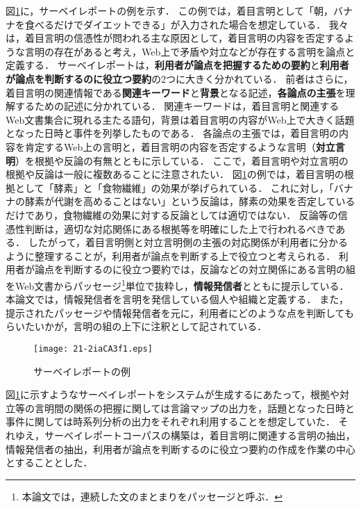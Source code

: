 \documentclass[japanese]{jnlp_1.4}
\begin{document}
図\ref{fg:survey_report}に，{サーベイ}レポートの例を示す．
この例では，着目言明として「朝，バナナを食べるだけでダイエットできる」が入力された場合を想定している．
{我々は}，着目言明の信憑性が問われる主な原因として，着目言明の内容を否定するような言明の存在があると考え，Web上で矛盾や対立などが存在する言明を論点と定義する．
サーベイレポートは，{\bf 利用者が{論点}を把握するため{の}要約}と{\bf 利用者が{論点}を判断するのに役立つ要約}の2つに大きく分かれて{いる．}
前者はさらに，{着目言明の関連情報である}{\bf 関連キーワード}と{\bf 背景}となる記述，{\bf 各論点の主張}を理解するための記述に分かれている．
関連キーワードは，着目言明と関連するWeb文書集合に現れる主たる語句，背景は着目言明の内容がWeb上で大きく話題となった日時と事件を列挙したものである．
各論点の主張では，着目言明の内容を肯定するWeb上の言明と，着目言明の内容を否定するような言明（{\bf 対立言明}）を根拠や反論の有無とともに示している．
{ここで}，着目言明や対立言明の根拠や反論は一般に複数あることに注意されたい．
図\ref{fg:survey_report}の例では，着目言明の根拠として「酵素」と「食物繊維」の効果が挙げられている．
これに対し，「バナナの酵素が代謝を高めることはない」という反論は，酵素の効果を否定しているだけであり，食物繊維の効果に対する反論としては適切ではない．
反論等の信憑性判断は，適切な対応関係にある根拠等を明確にした上で行われるべきである．
したがって，着目言明側と対立言明側の主張の対応関係が利用者に分かるように整理することが，利用者が論点を判断する上で役立つと考えられる．
利用者が{論点}を判断するのに役立つ要約では，反論などの対立関係にある言明の組をWeb文書からパッセージ\footnote{本論文では，連続した文のまとまりをパッセージと呼ぶ．}単位で抜粋し，{\bf 情報発信者}とともに提示している．
本論文では，情報発信者を言明を発信している個人や組織と定義する．
また，提示されたパッセージや情報発信者を元に，利用者にどのような点を判断してもらいたいかが，{言明}の組の上下に注釈として記されている．

\begin{figure}[t]
\begin{center}
\texttt{[image: 21-2iaCA3f1.eps]}
\end{center}
\caption{サーベイレポートの例}
\label{fg:survey_report}
\end{figure}

図\ref{fg:survey_report}に示すようなサーベイレポートをシステムが生成するにあたって，根拠や対立等の言明間の関係の把握に関しては言論マップの出力を，話題となった日時と事件に関しては時系列分析の出力をそれぞれ利用することを想定していた．
それゆえ，サーベイレポートコーパスの構築は，着目言明に関連する言明の抽出，情報発信者の抽出，利用者が{論点}を判断するのに役立つ要約の作成を作業の中心とすることとした．
\end{document}
